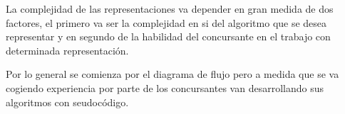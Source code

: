 La complejidad de las representaciones va depender en gran medida de dos factores, el primero va ser la complejidad en si del algoritmo que se desea representar y en segundo de la habilidad del concursante en el trabajo con determinada representación.

Por lo general se comienza por el diagrama de flujo pero a medida que se va cogiendo experiencia por parte de los concursantes van desarrollando sus algoritmos con seudocódigo. 